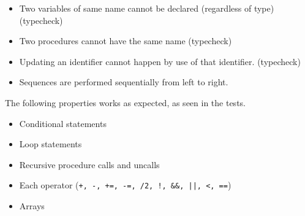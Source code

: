 \begin{itemize}
\item Two variables of same name cannot be declared (regardless of type) (typecheck)
\item Two procedures cannot have the same name (typecheck)
\item Updating an identifier cannot happen by use of that identifier. (typecheck)
\item Sequences are performed sequentially from left to right.
\end{itemize}

\vspace{0.2cm}
The following properties works as expected, as seen in the tests.
\begin{itemize}
\item Conditional statements
\item Loop statements
\item Recursive procedure calls and uncalls
\item Each operator ({\tt +, -, +=, -=, /2, !, \&\&, ||,  <, ==})
\item Arrays
\end{itemize}
